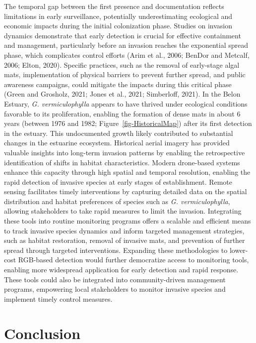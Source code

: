 \documentclass[
  letterpaper,
  DIV=11,
  numbers=noendperiod]{scrartcl}
\begin{document}
The temporal gap between the first presence and documentation reflects
limitations in early surveillance, potentially underestimating
ecological and economic impacts during the initial colonization phase.
Studies on invasion dynamics demonstrate that early detection is crucial
for effective containment and management, particularly before an
invasion reaches the exponential spread phase, which complicates control
efforts (Arim et al., 2006; BenDor and Metcalf, 2006; Elton, 2020).
Specific practices, such as the removal of early-stage algal mats,
implementation of physical barriers to prevent further spread, and
public awareness campaigns, could mitigate the impacts during this
critical phase (Green and Grosholz, 2021; Jones et al., 2021;
Simberloff, 2021). In the Belon Estuary, \emph{G. vermiculophylla}
appears to have thrived under ecological conditions favorable to its
proliferation, enabling the formation of dense mats in about 6 years
(between 1976 and 1982; Figure~\ref{fig-HistoricalMap}) after its first
detection in the estuary. This undocumented growth likely contributed to
substantial changes in the estuarine ecosystem. Historical aerial
imagery has provided valuable insights into long-term invasion patterns
by enabling the retrospective identification of shifts in habitat
characteristics. Modern drone-based systems enhance this capacity
through high spatial and temporal resolution, enabling the rapid
detection of invasive species at early stages of establishment. Remote
sensing facilitates timely interventions by capturing detailed data on
the spatial distribution and habitat preferences of species such as
\emph{G. vermiculophylla}, allowing stakeholders to take rapid measures
to limit the invasion. Integrating these tools into routine monitoring
programs offers a scalable and efficient means to track invasive species
dynamics and inform targeted management strategies, such as habitat
restoration, removal of invasive mats, and prevention of further spread
through targeted interventions. Expanding these methodologies to
lower-cost RGB-based detection would further democratize access to
monitoring tools, enabling more widespread application for early
detection and rapid response. These tools could also be integrated into
community-driven management programs, empowering local stakeholders to
monitor invasive species and implement timely control measures.

\section{Conclusion}\label{conclusion}
\end{document}
